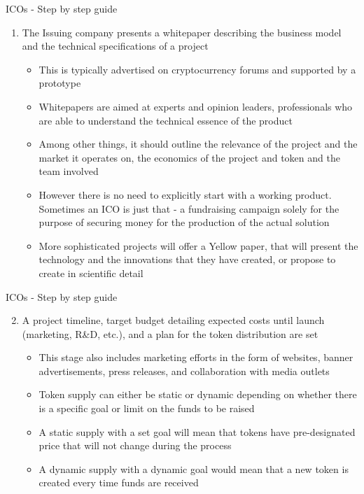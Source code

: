 \documentclass[11pt]{beamer}
\begin{document}
\begin{frame}{ICOs - Step by step guide}
	\begin{enumerate}
		\item The Issuing company presents a whitepaper describing the business model and the technical specifications of a project
		\begin{itemize}
			\item This is typically advertised on cryptocurrency forums and supported by a prototype
			\item Whitepapers are aimed at experts and opinion leaders, professionals who are able to understand the technical essence of the product
			\item Among other things, it should outline the relevance of the project and the market it operates on, the economics of the project and token and the team involved
			\item However there is no need to explicitly start with a working product. Sometimes an ICO is just that - a fundraising campaign solely for the purpose of securing money for the production of the actual solution
			\item More sophisticated projects will offer a Yellow paper, that will present the technology and the innovations that they have created, or propose to create in scientific detail
		\end{itemize}
	\end{enumerate}
\end{frame}


\begin{frame}{ICOs - Step by step guide}
	\begin{enumerate}
		\setcounter{enumi}{1}
		\item A project timeline, target budget detailing expected costs until launch (marketing, R\&D, etc.), and a plan for the token distribution are set
		\begin{itemize}
			\item This stage also includes marketing efforts in the form of websites, banner advertisements, press releases, and collaboration with media outlets
			\item Token supply can either be static or dynamic depending on whether there is a specific goal or limit on the funds to be raised
			\item A static supply with a set goal will mean that tokens have pre-designated price that will not change during the process
			\item A dynamic supply with a dynamic goal would mean that a new token is created every time funds are received
		\end{itemize}
	\end{enumerate}
\end{frame}
\end{document}
